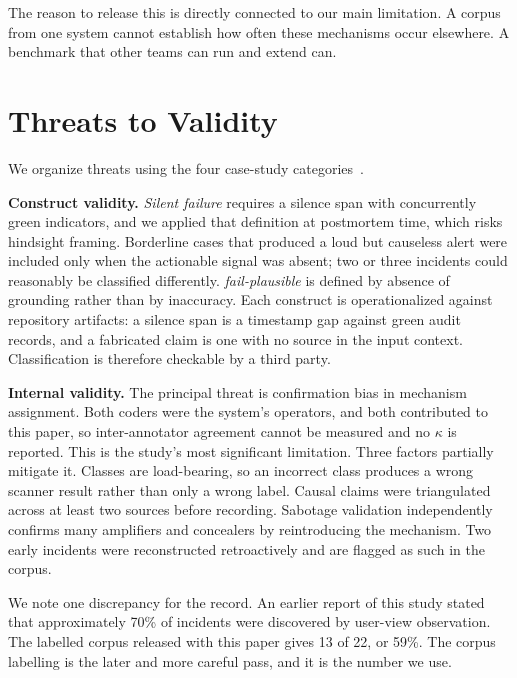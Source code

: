 \documentclass[conference]{IEEEtran}
\newcommand{\failplausible}{\emph{fail-plausible}}
\begin{document}
The reason to release this is directly connected to our main limitation. A
corpus from one system cannot establish how often these mechanisms occur
elsewhere. A benchmark that other teams can run and extend can.

\section{Threats to Validity}
\label{sec:threats}

We organize threats using the four case-study
categories~\cite{runeson2009case}.

\textbf{Construct validity.} \emph{Silent failure} requires a silence span
with concurrently green indicators, and we applied that definition at
postmortem time, which risks hindsight framing. Borderline cases that
produced a loud but causeless alert were included only when the actionable
signal was absent; two or three incidents could reasonably be classified
differently. \failplausible{} is defined by absence of grounding rather than
by inaccuracy. Each construct is operationalized against repository
artifacts: a silence span is a timestamp gap against green audit records,
and a fabricated claim is one with no source in the input context.
Classification is therefore checkable by a third party.

\textbf{Internal validity.} The principal threat is confirmation bias in
mechanism assignment. Both coders were the system's operators, and both
contributed to this paper, so inter-annotator agreement cannot be measured
and no $\kappa$ is reported. This is the study's most significant
limitation. Three factors partially mitigate it. Classes are load-bearing,
so an incorrect class produces a wrong scanner result rather than only a
wrong label. Causal claims were triangulated across at least two sources
before recording. Sabotage validation independently confirms many amplifiers
and concealers by reintroducing the mechanism. Two early incidents were
reconstructed retroactively and are flagged as such in the corpus.

We note one discrepancy for the record. An earlier report of this study
stated that approximately 70\% of incidents were discovered by user-view
observation. The labelled corpus released with this paper gives 13 of 22, or
59\%. The corpus labelling is the later and more careful pass, and it is the
number we use.
\end{document}
